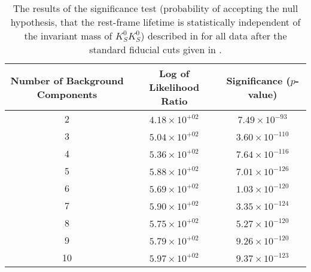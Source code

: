 \begin{table}[ht]
    \begin{center}
        \begin{tabular}{ccc}\toprule
            Number of Background Components & Log of Likelihood Ratio & Significance ($p$-value) \\\midrule
             2 & $4.18 \times 10^{+02}$ & $7.49 \times 10^{-93}$ \\
             3 & $5.04 \times 10^{+02}$ & $3.60 \times 10^{-110}$ \\
             4 & $5.36 \times 10^{+02}$ & $7.64 \times 10^{-116}$ \\
             5 & $5.88 \times 10^{+02}$ & $7.01 \times 10^{-126}$ \\
             6 & $5.69 \times 10^{+02}$ & $1.03 \times 10^{-120}$ \\
             7 & $5.90 \times 10^{+02}$ & $3.35 \times 10^{-124}$ \\
             8 & $5.75 \times 10^{+02}$ & $5.27 \times 10^{-120}$ \\
             9 & $5.79 \times 10^{+02}$ & $9.26 \times 10^{-120}$ \\
             10 & $5.97 \times 10^{+02}$ & $9.37 \times 10^{-123}$ \\\bottomrule
        \end{tabular}
        \caption{The results of the significance test (probability of accepting the null hypothesis, that the rest-frame lifetime is statistically independent of the invariant mass of $K_S^0K_S^0$) described in  for all data after the standard fiducial cuts given in .}\label{tab:independence-test}
    \end{center}
\end{table}